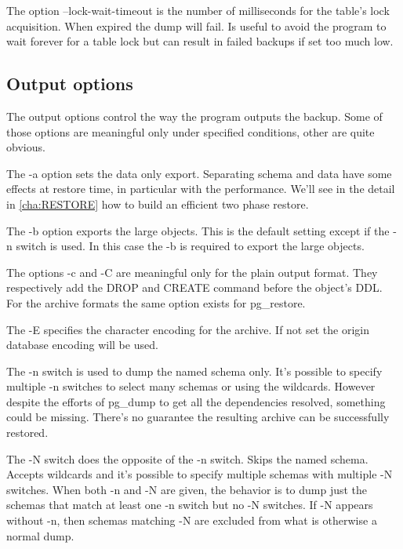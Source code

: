 The option --lock-wait-timeout is the number of milliseconds for the table's lock acquisition. 
When expired the dump will fail. Is useful to avoid the program to wait forever for a table lock 
but can result in failed backups if set too much low.

\subsection{Output options}
The output options control the way the program outputs the backup. Some of those options are 
meaningful only under specified conditions, other are quite obvious.\newline

The -a option sets the data only export. Separating schema and data have some effects at restore 
time, in particular with the performance. We'll see in the detail in \ref{cha:RESTORE} how to 
build an efficient two phase restore.\newline

The -b option exports the large objects. This is the default setting except if the -n switch is 
used. In this case the -b is required to export the large objects.\newline

The options -c and -C are meaningful only for the plain output format. They respectively add the 
DROP and CREATE command before the object's DDL. For the archive formats the same option exists for 
pg\_restore.\newline

The -E specifies the character encoding for the archive. If not set the origin database encoding 
will be used.\newline 

The -n switch is used to dump the named schema only. It's possible to specify multiple -n switches 
to select many schemas or using the wildcards. However despite the efforts of pg\_dump to get all 
the dependencies resolved, something could be missing. There's no guarantee the resulting archive 
can be successfully restored.\newline

The -N switch does the opposite of the -n switch. Skips the named schema. Accepts wildcards and 
it's possible to specify multiple schemas with multiple -N switches. When both -n and -N are given, 
the behavior is to dump just the schemas that match at least one -n switch but no -N switches. If -N 
appears without -n, then schemas matching -N are excluded from what is otherwise a normal 
dump.\newline

